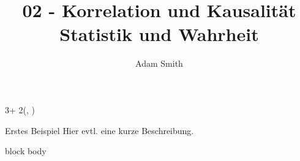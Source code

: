 \documentclass{beamer}
\title{02 - Korrelation und Kausalität \\
	\Large{Statistik und Wahrheit}}
\author{%
	Adam Smith
}
\date{}
\newlength{\blockOne}
\begin{document}


\begin{frame}[t]	%





\TPshowboxestrue




\begin{textblock*}{3\colwidth + 2\colsep}(\leftmargin, \blockOne)

\begin{alertblock}{%
	\begin{minipage}[b]{60pt}
		\RaggedRight
		\noindent\hspace{-10pt}
	\end{minipage}%
	\begin{minipage}[b]{3\colwidth+2\colsep-125pt}\strut%
		Erstes Beispiel \;
		{\mdseries Hier evtl. eine kurze Beschreibung.}
	\end{minipage}%
}
	\vspace{-0.25cm}
	\begin{minipage}{\textwidth}
		\begin{beamercolorbox}[
			ht = 23.5cm, 
			wd = \linewidth, 
			left
		]{block body}
			\par
		\end{beamercolorbox}
	\end{minipage}%
	\vspace{0.5cm}
\end{alertblock}

\end{textblock*}


\end{frame}
\end{document}
